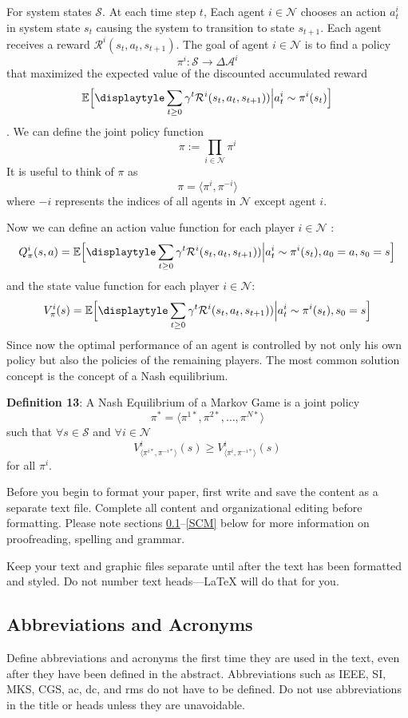 \documentclass[conference]{IEEEtran}
\begin{document}
For  system states $\mathcal{S}$. At each time step $t$, Each agent $i \in \mathcal{N}$ chooses an action $a^i_t$ in system state $s_t$ causing the system to transition to state $s_{t+1}$. Each agent receives a reward $\mathcal{R}^i(s_t, a_t, s_{t+1})$. The goal of agent $i\in\mathcal{N}$ is to find a policy $$\pi^i \mathpunct{:} \mathcal{S} \to \Delta \mathcal{A}^i$$ that maximized the expected value of the discounted accumulated reward $$\mathbb{E}\Big[\displaytyle\sum_{t\geq 0}\gamma^t\mathcal{R}^i(s_t, a_t, s_{t+1}))\Big| a^i_t \sim \pi^i(s_t)\Big]$$. We can define the joint policy function $$\pi \mathpunct{:=} \prod_{i\in \mathcal{N}}\pi^i$$ It is useful to think of $\pi$ as $$\pi = \langle \pi^i, \pi^{-i} \rangle$$ where $−i$ represents the indices of all agents in $\mathcal{N}$ except agent $i$.

\par Now we can define an action value function for each player $i \in \mathcal{N}$ : $$Q^i_{\pi}(s, a) = \mathbb{E}\Big[\displaytyle\sum_{t\geq 0}\gamma^t\mathcal{R}^i(s_t, a_t, s_{t+1}))\Big| a^i_t \sim \pi^i(s_t), a_0 = a, s_0 = s\Big]$$ and the state value function for each player $i \in \mathcal{N}$:
$$V^i_{\pi}(s) = \mathbb{E}\Big[\displaytyle\sum_{t\geq 0}\gamma^t\mathcal{R}^i(s_t, a_t, s_{t+1}))\Big| a^i_t \sim \pi^i(s_t), s_0 = s\Big]$$ 
Since now the optimal performance of an agent is controlled by not only his own policy but also the policies of the remaining players. The most common solution concept is the concept of a Nash equilibrium.

\textbf{Definition 13}: A Nash Equilibrium of a Markov Game is a joint policy $$ \pi^* = \langle \pi^{1*}, \pi^{2*}, \ldots, \pi^{N*} \rangle $$ such that $\forall s \in \mathcal{S}$ and $\forall i \in \mathcal{N}$ $$V^i_{\langle \pi^{i*}, \pi^{-i*} \rangle}(s) \geq V^i_{\langle \pi^{i}, \pi^{-i*} \rangle}(s)$$ for all $\pi^i$.

Before you begin to format your paper, first write and save the content as a 
separate text file. Complete all content and organizational editing before 
formatting. Please note sections \ref{AA}--\ref{SCM} below for more information on 
proofreading, spelling and grammar.

Keep your text and graphic files separate until after the text has been 
formatted and styled. Do not number text heads---{\LaTeX} will do that 
for you.

\subsection{Abbreviations and Acronyms}\label{AA}
Define abbreviations and acronyms the first time they are used in the text, 
even after they have been defined in the abstract. Abbreviations such as 
IEEE, SI, MKS, CGS, ac, dc, and rms do not have to be defined. Do not use 
abbreviations in the title or heads unless they are unavoidable.
\end{document}
